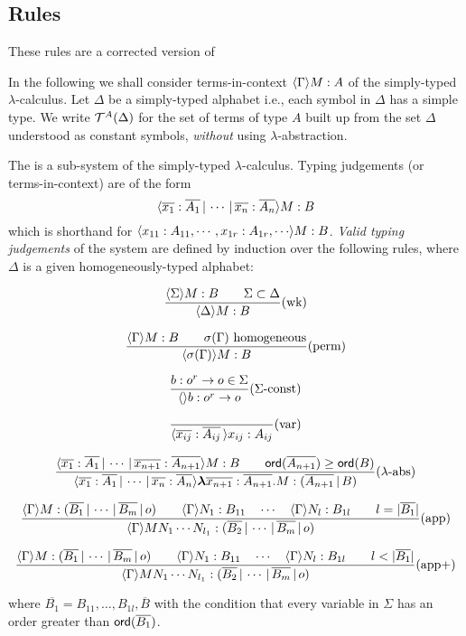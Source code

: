 \subsection{Rules }

These rules are a corrected version of
\cite{DBLP:conf/fossacs/AehligMO05}

 In the following we shall
consider terms-in-context $\langle \Gamma \rangle{M : A}$ of the simply-typed
$\lambda$-calculus. Let $\Delta$ be a simply-typed alphabet i.e.,
each symbol in $\Delta$ has a simple type. We write
${\cal T}^{A}(\Delta)$ for the set of terms of type $A$ built up from
the set $\Delta$ understood as constant symbols, \emph{without}
using $\lambda$-abstraction.


The  is a sub-system of the
simply-typed $\lambda$-calculus. Typing judgements (or
terms-in-context) are of the form
\begin{equation}
\nonumber \langle \overline{x_1}:\overline{A_1} \, | \, \cdots \, | \,
\overline{x_n} :  \overline{A_n} \rangle{M : B}
\end{equation}
which is shorthand for $\seq{x_{11} : A_{11}, \cdots, x_{1r}:
A_{1r}, \cdots}{M : B}$. \emph{Valid typing judgements} of the
system are defined by induction over the following rules, where
$\Delta$ is a given homogeneously-typed alphabet:

\[ {    { \langle \Sigma \rangle{M:B} \qquad {\Sigma \subset \Delta} }
    \over
        { \langle \Delta  \rangle{M : B}}
   }
   (\mbox{wk})
\]

\[  {
      { \langle \Gamma \rangle{M:B} \qquad \sigma(\Gamma) \hbox{ homogeneous} }
    \over
      { \langle \sigma(\Gamma) \rangle{M : B} }
    }
    (\mbox{perm})
\]


\[{ {b : o^r \rightarrow o \in \Sigma } \over {\langle  \rangle{b : o^r \rightarrow o}}}  (\Sigma\mbox{-const})  \]

\[{ \over
{\langle \overline{x_{ij}} : \overline{A_{ij}}\,  \rangle{x_{ij} :
A_{ij}}}}(\mbox{var})\]

\[
{ {\langle \overline{x_1} : \overline{A_1}\, | \, \cdots\, | \,
\overline{x_{n+1}} : \overline{A_{n+1}} \rangle{M : B}} \qquad
{\sf ord}(\overline{A_{n+1}}) \geq {\sf ord}(B) \over {\langle \overline{x_1} :
\overline{A_1}\, | \, \cdots\, | \, \overline{x_{n}} :
\overline{A_{n}} \rangle{{\hbox{\boldmath $\lambda$}{\overline{x_{n+1}} : \overline{A_{n+1}}}.{M}}
: (\overline{A_{n+1}} \, | \, B)}} } (\mbox{$\lambda$-abs})\]

\[ {{\langle \Gamma \rangle{M : (\overline{B_1} \, | \, \cdots \, | \, \overline{B_m} \, | \, o)} \qquad
\langle \Gamma \rangle{N_1 : B_{11}} \quad \cdots \quad \langle \Gamma \rangle{N_{l} : B_{1l}} \qquad l = |\overline{B_1}|
}
\over{ \langle \Gamma \rangle{M N_1 \cdots N_{l_1} :
(\overline{B_2} \, | \, \cdots \, | \, \overline{B_m} \, | \, o)}}}
(\mbox{app})\]


\[ {{\langle \Gamma \rangle{M : (\overline{B_1} \, | \, \cdots \, | \, \overline{B_m} \, | \, o)} \qquad
\langle \Gamma \rangle{N_1 : B_{11}} \quad \cdots \quad \langle \Gamma \rangle{N_{l} : B_{1l}} \qquad l < |\overline{B_1}|
}
\over{ \langle \Gamma \rangle{M N_1 \cdots N_{l_1} :
(\overline{B_2} \, | \, \cdots \, | \, \overline{B_m} \, | \, o)}}}
(\mbox{app+})\]

where $\overline{B_1} = B_{11}, \ldots, B_{1l},\overline{B}$ with the condition that every variable in $\Sigma$ has an order greater than ${\sf ord}(\overline{B_1})$.
